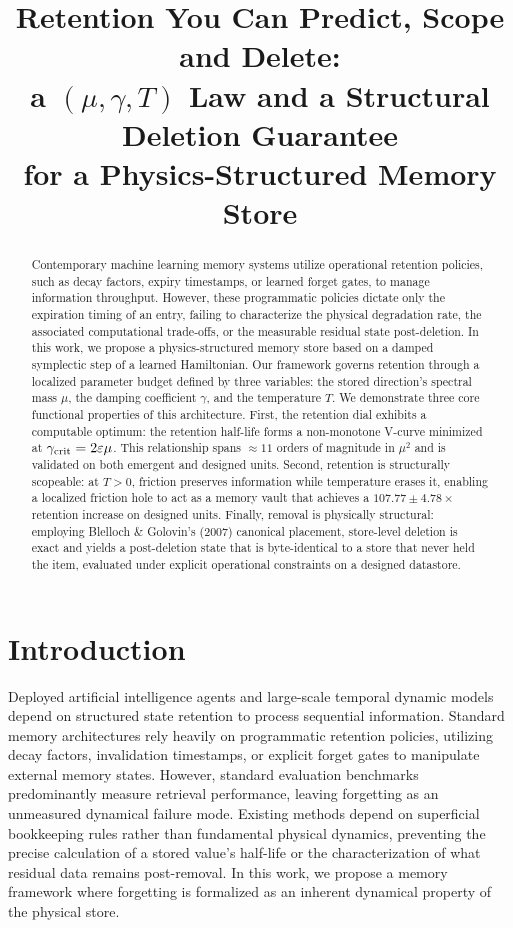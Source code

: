 \documentclass{article}
\title{Retention You Can Predict, Scope and Delete:\\ a $(\mu,\gamma,T)$ Law and a Structural Deletion Guarantee\\ for a Physics-Structured Memory Store}
\author{}
\begin{document}
\maketitle
\begin{abstract}
Contemporary machine learning memory systems utilize operational retention policies, such as decay factors, expiry timestamps, or learned forget gates, to manage information throughput. However, these programmatic policies dictate only the expiration timing of an entry, failing to characterize the physical degradation rate, the associated computational trade-offs, or the measurable residual state post-deletion. In this work, we propose a physics-structured memory store based on a damped symplectic step of a learned Hamiltonian. Our framework governs retention through a localized parameter budget defined by three variables: the stored direction's spectral mass $\mu$, the damping coefficient $\gamma$, and the temperature $T$. We demonstrate three core functional properties of this architecture. First, the retention dial exhibits a computable optimum: the retention half-life forms a non-monotone V-curve minimized at $\gamma_{\rm crit}=2\varepsilon\mu$. This relationship spans $\approx11$ orders of magnitude in $\mu^2$ and is validated on both emergent and designed units. Second, retention is structurally scopeable: at $T>0$, friction preserves information while temperature erases it, enabling a localized friction hole to act as a memory vault that achieves a $107.77\pm4.78\times$ retention increase on designed units. Finally, removal is physically structural: employing Blelloch \& Golovin's (2007) canonical placement, store-level deletion is exact and yields a post-deletion state that is byte-identical to a store that never held the item, evaluated under explicit operational constraints on a designed datastore.
\end{abstract}

\section{Introduction}\label{sec:intro}

Deployed artificial intelligence agents and large-scale temporal dynamic models depend on structured state retention to process sequential information. Standard memory architectures rely heavily on programmatic retention policies, utilizing decay factors, invalidation timestamps, or explicit forget gates to manipulate external memory states. However, standard evaluation benchmarks predominantly measure retrieval performance, leaving forgetting as an unmeasured dynamical failure mode. Existing methods depend on superficial bookkeeping rules rather than fundamental physical dynamics, preventing the precise calculation of a stored value's half-life or the characterization of what residual data remains post-removal. In this work, we propose a memory framework where forgetting is formalized as an inherent dynamical property of the physical store.
\end{document}
